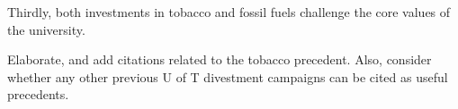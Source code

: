 Thirdly, both investments in tobacco and fossil fuels challenge the core values of the university.


\begin{vcom}
	Elaborate, and add citations related to the tobacco precedent. Also, consider whether any other previous U of T divestment campaigns can be cited as useful precedents.
\end{vcom}



